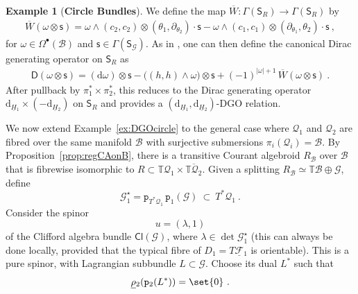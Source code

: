 \documentclass[a4paper, reqno, 11pt]{amsart}
\numberwithin{equation}{section}
\theoremstyle{definition}
\newtheorem{example}[equation]{Example}
\newcommand{\red}[1]{\underline{#1}}
\newcommand{\de}{\mathrm{d}}
\newcommand{\rmp}{\mathtt{p}}
\newcommand{\IT}{\mathbb{T}}
\newcommand{\Cl}{\mathsf{Cl}}
\newcommand{\cB}{{\mathcal B}}
\newcommand{\cQ}{{\mathcal Q}}
\newcommand{\cF}{{\mathcal F}}
\newcommand{\ccG}{{\mathscr G}}
\newcommand{\sfD}{{\mathsf{D}}}
\newcommand{\sfS}{{\mathsf{S}}}
\newcommand{\sfs}{{\mathsf{s}}}
\newcommand{\sfGamma}{{\mathsf{\Gamma}}}
\theoremstyle{remark}
\begin{document}
\begin{example}[\textbf{Circle Bundles}]
We define the map $\overline{W}:\sfGamma(\sfS_{R})\to\sfGamma(\sfS_{R})$ by
\begin{align}\label{eqn:wbarincirclecase}
    \overline{W}(\omega \otimes \sfs) = \omega \wedge(c_2, c_2) \otimes (\theta_1,\partial_{\theta_2}) \cdot \sfs - \omega \wedge(c_1,c_1)\otimes (\partial_{\theta_1},\theta_2) \cdot \sfs \ ,
\end{align}
for $\omega \in \Omega^\bullet(\cB)$ and $\sfs \in \sfGamma(\sfS_\ccG)$.
As in \cite[Theorem 61]{Cortes:2019roa}, one can then define the canonical Dirac generating operator on $\sfS_{R}$ as
\begin{align}
    \sfD(\omega \otimes \sfs) = (\de \omega) \otimes \sfs - \big((h,h) \wedge \omega\big) \otimes \sfs +(-1)^{|\omega|+1}\,\overline{W}(\omega \otimes \sfs) \ .
\end{align}
After pullback by $\pi_1^* \times \pi_2^*$, this reduces to the Dirac generating operator $\de_{\red H{}_1}\times(-\de_{\red H{}_2})$ on $\sfS_{R}$ and  provides a $(\de_{\red H{}_1},\de_{\red H{}_2})$-DGO relation.
\end{example}

We now extend Example~\ref{ex:DGOcircle} to the general case where $\cQ_1$ and $\cQ_2$ are fibred over the same manifold $\cB$ with surjective submersions $\pi_i (\cQ_i)= \cB$.
By Proposition~\ref{prop:regCAonB}, there is a transitive Courant algebroid $R_\cB$ over $\cB$ that is fibrewise isomorphic to $R\subset \IT\cQ_1\times\overline{\IT\cQ_2}$. 
Given a splitting $R_\cB \simeq \IT \cB \oplus \ccG$, define $$\ccG_1^\star = \rmp_{T^*\cQ_1}\,\rmp_1(\ccG) \ \subset \ T^*\cQ_1 \ . $$  Consider the spinor $$u = (\lambda, 1)$$ of the Clifford algebra bundle $\Cl(\ccG)$, where $\lambda\in \det \ccG_1^\star$ (this can always be done locally, provided that the typical fibre of $D_1 = T\red\cF{}_1$ is orientable). This is a pure spinor, with Lagrangian subbundle $L\subset \ccG$. Choose its dual $L^*$ such that $$\red\rho{}_2(\rmp_2(L^*)) = \set{0} \ . $$ 
\end{document}
